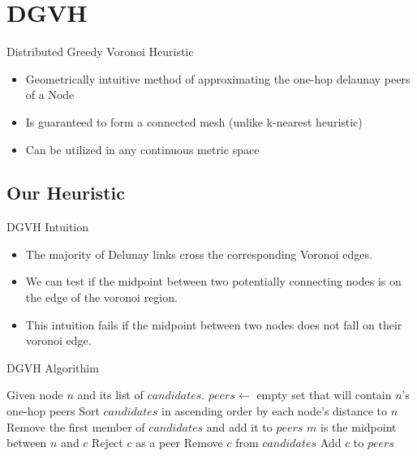\documentclass[8pt]{beamer}
\begin{document}
	

	
\section{DGVH}
	\begin{frame}{Distributed Greedy Voronoi Heuristic}
		\begin{itemize}
			\item Geometrically intuitive method of approximating the one-hop delaunay peers of a Node
			\item Is guaranteed to form a connected mesh (unlike k-nearest heuristic)
			\item Can be utilized in any continuous metric space
		\end{itemize}
		
	\end{frame}
	
	\subsection{Our Heuristic}

	\begin{frame}{DGVH Intuition}

		\begin{itemize}
			\item The majority of Delunay links cross the corresponding Voronoi edges.
			\item We can test if the midpoint between two potentially connecting nodes is on the edge of the voronoi region.
			\item This intuition fails if the midpoint between two nodes does not fall on their voronoi edge.
		\end{itemize}

	\end{frame}
	
	
	\begin{frame}{DGVH Algorithim}

			\begin{algorithmic}[1]  %
				\STATE Given node $n$ and its list of $candidates$.
				\STATE $peers \leftarrow$ empty set that will contain $n$'s one-hop peers
				\STATE Sort $candidates$ in ascending order by each node's distance to $n$
				\STATE Remove the first member of $candidates$ and add it to $peers$
				\STATE $m$ is the midpoint between $n$ and $c$
				\STATE Reject $c$ as a peer
				\ELSE
				\STATE Remove $c$ from $candidates$
				\STATE Add $c$ to $peers$
				\ENDIF
				\ENDFOR
			\end{algorithmic}

	\end{frame}
	
\end{document}
